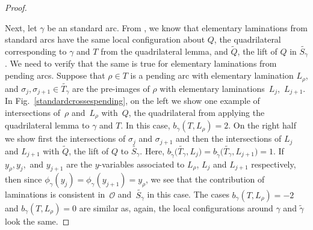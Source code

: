 \documentclass[pdftex]{sigma}%
\numberwithin{equation}{section}
\begin{document}
\begin{proof}
\begin{center}
\end{center}

 Next, let $\gamma$ be an standard arc. From \cite{MSW}, we know that elementary laminations from standard arcs have the same local configuration about $Q$, the quadrilateral corresponding to $\gamma$ and $T$ from the quadrilateral lemma, and $\widetilde{Q}$, the lift of $Q$ in $\widetilde{S_\gamma}$. We need to verify that the same is true for elementary laminations from pending arcs. Suppose that $\rho \in T$ is a pending arc with elementary lamination $L_\rho$, and $\sigma_j, \sigma_{j+1} \in \widetilde{T_\gamma}$ are the pre-images of $\rho$ with elementary laminations~$L_j$,~$L_{j+1}$. In Fig.~\ref{standardcrossespending}, on the left we show one example of intersections of~$\rho$ and~$L_\rho$ with~$Q$, the quadrilateral from applying the quadrilateral lemma to $\gamma$ and $T$. In this case, $b_\gamma(T, L_\rho) = 2$. On the right half we show first the intersections of $\sigma_j$ and $\sigma_{j+1}$ and then the intersections of $L_j$ and $L_{j+1}$ with $\widetilde{Q}$, the lift of $Q$ to $\widetilde{S_\gamma}$. Here, $b_{\widetilde{\gamma}}\big(\widetilde{T_\gamma}, L_j\big) = b_{\widetilde{\gamma}}\big(\widetilde{T_\gamma}, L_{j+1}\big) = 1$. If $y_\rho, y_j,$ and $ y_{j+1}$ are the $y$-variables associated to $L_\rho$, $L_j$ and $L_{j+1}$ respectively, then since $\phi_\gamma(y_j) = \phi_\gamma(y_{j+1}) = y_\rho$, we see that the contribution of laminations is consistent in~$\mathcal{O}$ and~$\widetilde{S_\gamma}$ in this case. The cases $b_\gamma(T, L_\rho) = -2$ and $b_\gamma(T, L_\rho) =0 $ are similar as, again, the local configurations around $\gamma$ and $\widetilde{\gamma}$ look the same.
\end{proof}
\end{document}

